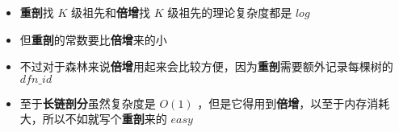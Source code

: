 \documentclass[E:/GsjzTle/main/main.tex]{subfiles}
\begin{document}
\begin{itemize}
\item
  \textbf{重剖}找 \(K\) 级祖先和\textbf{倍增}找 \(K\)
  级祖先的理论复杂度都是 \(log\)
\item
  但\textbf{重剖}的常数要比\textbf{倍增}来的小
\item
  不过对于森林来说\textbf{倍增}用起来会比较方便，因为\textbf{重剖}需要额外记录每棵树的
  \(dfn\_id\)
\item
  至于\textbf{长链剖分}虽然复杂度是 \(O(1)\)
  ，但是它得用到\textbf{倍增}，以至于内存消耗大，所以不如就写个\textbf{重剖}来的
  \(easy\)
\end{itemize}
\end{document}
